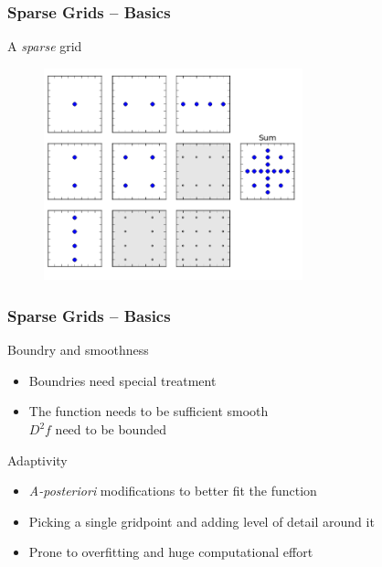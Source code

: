\begin{frame}
  \frametitle{Sparse Grids -- Basics}
  \topline
  \vspace{-10px}
  \begin{block}{A \emph{sparse} grid}
    \begin{figure}[!htp]
      \centering
      \includegraphics[width=7.5cm]{images/sparsegrid_hirach2}
      \vspace{-12px}
      \caption{}
    \end{figure}
  \end{block}
\end{frame}

\begin{frame}
  \frametitle{Sparse Grids -- Basics}
  \topline
  \vspace{-10px}
  \begin{block}{Boundry and smoothness}
    \begin{itemize}
      \item Boundries need special treatment
      \item The function needs to be sufficient smooth \\
        $D^2f$ need to be bounded
      \end{itemize}
  \end{block}
  \begin{block}{Adaptivity}
    \begin{itemize}
      \item \emph{A-posteriori} modifications to better fit the function
      \item Picking a single gridpoint and adding level of detail around it
      \item Prone to overfitting and huge computational effort
      \end{itemize}
  \end{block}
\end{frame}



